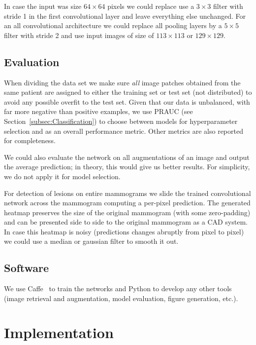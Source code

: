 	In case the input was size $64 \times 64$ pixels we could replace use a $3 \times 3$ filter with stride 1 in the first convolutional layer and leave everything else unchanged. For an all convolutional architecture we could replace all pooling layers by a $5 \times 5$ filter  with stride 2 and use input images of size of $113 \times 113$ or $129 \times 129$.


	\subsection{Evaluation}
	When dividing the data set we make sure \textit{all} image patches obtained from the same patient are assigned to either the training set or test set (not distributed) to avoid any possible overfit to the test set. Given that our data is unbalanced, with far more negative than positive examples, we use PRAUC (see Section~\ref{subsec:Classification}) to choose between models for hyperparameter selection and as an overall performance metric. Other metrics are also reported for completeness. 

	We could also evaluate the network on all augmentations of an image and output the average prediction; in theory, this would give us better results. For simplicity, we do not apply it for model selection.

	For detection of lesions on entire mammograms we slide the trained convolutional network across the mammogram computing a per-pixel prediction. The generated heatmap preserves the size of the original mammogram (with some zero-padding) and can be presented side to side to the original mammogram as a CAD system. In case this heatmap is noisy (predictions changes abruptly from pixel to pixel) we could use a median or gaussian filter to smooth it out.%

	\subsection{Software}
	We use Caffe~\cite{Jia2014} to train the networks and Python to develop any other tools (image retrieval and augmentation, model evaluation, figure generation, etc.).


\section{Implementation}


